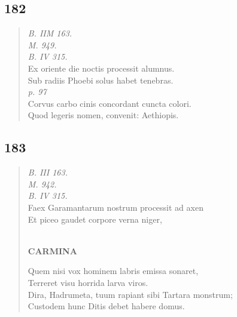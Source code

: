 \documentclass[11pt, a4paper]{report}
\begin{document}
            \subsection*{182}
      \begin{verse}
      \textit{B. IIM 163.} \\ \textit{M. 949.} \\ \textit{B. IV 315.} \\ Ex oriente die noctis processit alumnus. \\ Sub radiis Phoebi solus habet tenebras. \\ \textit{p. 97} \\ Corvus carbo cinis concordant cuncta colori. \\ Quod legeris nomen, convenit: Aethiopis. \\ 
      \end{verse}
  
            \subsection*{183}
      \begin{verse}
      \textit{B. III 163.} \\ \textit{M. 942.} \\ \textit{B. IV 315.} \\ Faex Garamantarum nostrum processit ad axen \\ Et piceo gaudet corpore verna niger, \\ 
        ﻿\pagebreak 
    \begin{center} \textbf{CARMINA} \end{center}Quem nisi vox hominem labris emissa sonaret, \\ Terreret visu horrida larva viros. \\ Dira, Hadrumeta, tuum rapiant sibi Tartara monstrum; \\ Custodem hunc Ditis debet habere domus. \\ 
      \end{verse}
  
\end{document}
